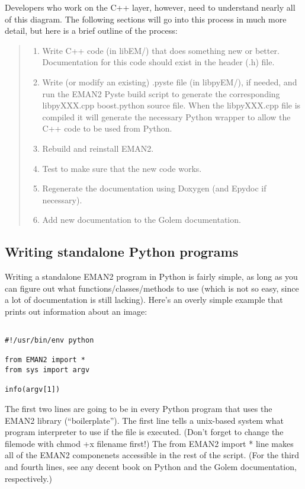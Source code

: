  Developers who work on the C++ layer, however, need to understand nearly all of this diagram. The following sections will go into this process in much more detail, but here is a brief outline of the process:
\begin{quote}
\begin{enumerate}
\item Write C++ code (in libEM/) that does something new or better. Documentation for this code should exist in the header (.h) file.
\item Write (or modify an existing) .pyste file (in libpyEM/), if needed, and run the EMAN2 Pyste build script to generate the corresponding libpyXXX.cpp boost.python source file. When the libpyXXX.cpp file is compiled it will generate the necessary Python wrapper to allow the C++ code to be used from Python.
\item Rebuild and reinstall EMAN2.
\item Test to make sure that the new code works.
\item Regenerate the documentation using Doxygen (and Epydoc if necessary).
\item Add new documentation to the Golem documentation.

\end{enumerate}

\end{quote}
\subsection{Writing standalone Python programs}


 Writing a standalone EMAN2 program in Python is fairly simple, as long as you can figure out what functions/classes/methods to use (which is not so easy, since a lot of documentation is still lacking). Here's an overly simple example that prints out information about an image:
\begin{verbatim}

#!/usr/bin/env python

from EMAN2 import *
from sys import argv

info(argv[1])

\end{verbatim}


 The first two lines are going to be in every Python program that uses the EMAN2 library (``boilerplate''). The first line tells a unix-based system what program interpreter to use if the file is executed. (Don't forget to change the filemode with chmod +x filename first!) The from EMAN2 import * line makes all of the EMAN2 componenets accessible in the rest of the script. (For the third and fourth lines, see any decent book on Python and the Golem documentation, respectively.)


